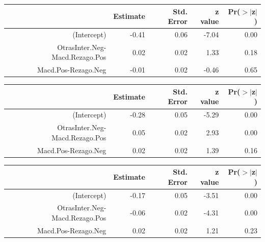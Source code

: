 \documentclass[a4paper,12pt]{Latex/Classes/PhDthesisPSnPDF}
\begin{document}
\begin{center}
\begin{table}[ht]
\centering
\begin{tabular}{rrrrr}
  \hline
 & Estimate & Std. Error & z value & Pr($>$$|$z$|$) \\ 
  \hline
(Intercept) & -0.41 & 0.06 & -7.04 & 0.00 \\ 
  OtrasInter.Neg-Macd.Rezago.Pos & 0.02 & 0.02 & 1.33 & 0.18 \\ 
  Macd.Pos-Rezago.Neg & -0.01 & 0.02 & -0.46 & 0.65 \\ 
   \hline
\end{tabular}
\end{table}\end{center}

\begin{center}
\begin{table}[ht]
\centering
\begin{tabular}{rrrrr}
  \hline
 & Estimate & Std. Error & z value & Pr($>$$|$z$|$) \\ 
  \hline
(Intercept) & -0.28 & 0.05 & -5.29 & 0.00 \\ 
  OtrasInter.Neg-Macd.Rezago.Pos & 0.05 & 0.02 & 2.93 & 0.00 \\ 
  Macd.Pos-Rezago.Neg & 0.02 & 0.02 & 1.39 & 0.16 \\ 
   \hline
\end{tabular}
\end{table}\end{center}

\newpage
\begin{center}
\begin{table}[ht]
\centering
\begin{tabular}{rrrrr}
  \hline
 & Estimate & Std. Error & z value & Pr($>$$|$z$|$) \\ 
  \hline
(Intercept) & -0.17 & 0.05 & -3.51 & 0.00 \\ 
  OtrasInter.Neg-Macd.Rezago.Pos & -0.06 & 0.02 & -4.31 & 0.00 \\ 
  Macd.Pos-Rezago.Neg & 0.02 & 0.02 & 1.21 & 0.23 \\ 
   \hline
\end{tabular}
\end{table}\end{center}
\end{document}
